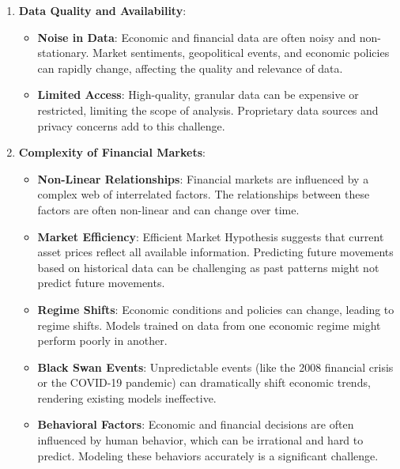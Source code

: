 \documentclass[11pt, reqno]{amsart}
\theoremstyle{definition}
\theoremstyle{remark}
\begin{document}
  \begin{enumerate}
    \item \textbf{Data Quality and Availability}:
      \begin{itemize}
        \item \textbf{Noise in Data}: Economic and financial data are often noisy
          and non-stationary. Market sentiments, geopolitical events, and
          economic policies can rapidly change, affecting the quality and relevance
          of data.

        \item \textbf{Limited Access}: High-quality, granular data can be
          expensive or restricted, limiting the scope of analysis. Proprietary
          data sources and privacy concerns add to this challenge.
      \end{itemize}

    \item \textbf{Complexity of Financial Markets}:
      \begin{itemize}
        \item \textbf{Non-Linear Relationships}: Financial markets are influenced
          by a complex web of interrelated factors. The relationships between
          these factors are often non-linear and can change over time.

        \item \textbf{Market Efficiency}: Efficient Market Hypothesis suggests that
          current asset prices reflect all available information. Predicting
          future movements based on historical data can be challenging as past
          patterns might not predict future movements.

        \item \textbf{Regime Shifts}: Economic conditions and policies can change,
          leading to regime shifts. Models trained on data from one economic regime
          might perform poorly in another.

        \item \textbf{Black Swan Events}: Unpredictable events (like the 2008
          financial crisis or the COVID-19 pandemic) can dramatically shift economic
          trends, rendering existing models ineffective.

        \item \textbf{Behavioral Factors}: Economic and financial decisions are often
          influenced by human behavior, which can be irrational and hard to
          predict. Modeling these behaviors accurately is a significant challenge.


\end{itemize}
\end{enumerate}
\end{document}
